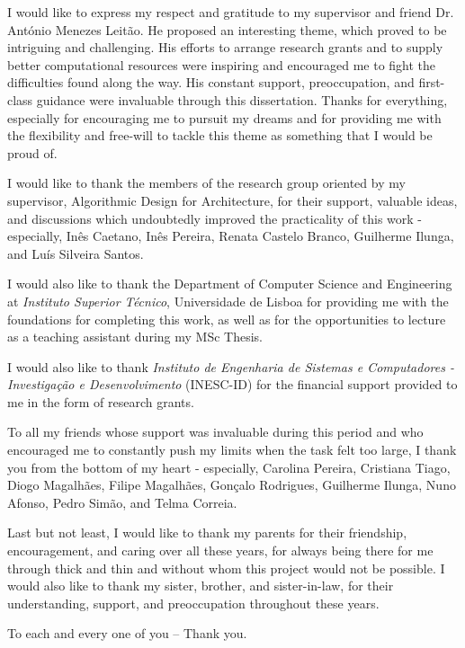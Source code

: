 
I would like to express my respect and gratitude to my supervisor and friend Dr. António Menezes Leitão. He proposed an interesting theme, which proved to be intriguing and challenging. His efforts to arrange research grants and to supply better computational resources were inspiring and encouraged me to fight the difficulties found along the way. His constant support, preoccupation, and first-class guidance were invaluable through this dissertation. Thanks for everything, especially for encouraging me to pursuit my dreams and for providing me with the flexibility and free-will to tackle this theme as something that I would be proud of.  

I would like to thank the members of the research group oriented by my supervisor, Algorithmic Design for Architecture, for their support, valuable ideas, and discussions which undoubtedly improved the practicality of this work - especially, Inês Caetano, Inês Pereira, Renata Castelo Branco, Guilherme Ilunga, and Luís Silveira Santos. 

I would also like to thank the Department of Computer Science and Engineering at \textit{Instituto Superior Técnico}, Universidade de Lisboa for providing me with the foundations for completing this work, as well as for the opportunities to lecture as a teaching assistant during my MSc Thesis. 

I would also like to thank \textit{Instituto de Engenharia de Sistemas e Computadores - Investigação e Desenvolvimento} (INESC-ID) for the financial support provided to me in the form of research grants.


To all my friends whose support was invaluable during this period and who encouraged me to constantly push my limits when the task felt too large, I thank you from the bottom of my heart - especially, Carolina Pereira, Cristiana Tiago, Diogo Magalhães, Filipe Magalhães, Gonçalo Rodrigues, Guilherme Ilunga, Nuno Afonso, Pedro Simão, and Telma Correia.

Last but not least, I would like to thank my parents for their friendship, encouragement, and caring over all these years, for always being there for me through thick and thin and without whom this project would not be possible. I would also like to thank my sister, brother, and sister-in-law, for their understanding, support, and preoccupation throughout these years.

To each and every one of you -- Thank you.